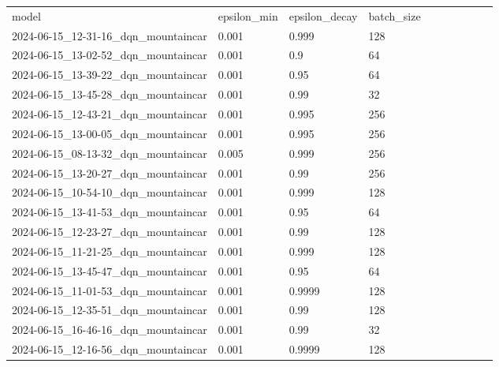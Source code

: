 \documentclass[a4paper,12pt]{article}
\begin{document}
\begin{center}
    \resizebox{\textwidth}{!} {
        \begin{tabular}{llllllllll}
            model                                  & epsilon\_min & epsilon\_decay & batch\_size \\
            2024-06-15\_12-31-16\_dqn\_mountaincar & 0.001        & 0.999          & 128         \\
            2024-06-15\_13-02-52\_dqn\_mountaincar & 0.001        & 0.9            & 64          \\
            2024-06-15\_13-39-22\_dqn\_mountaincar & 0.001        & 0.95           & 64          \\
            2024-06-15\_13-45-28\_dqn\_mountaincar & 0.001        & 0.99           & 32          \\
            2024-06-15\_12-43-21\_dqn\_mountaincar & 0.001        & 0.995          & 256         \\
            2024-06-15\_13-00-05\_dqn\_mountaincar & 0.001        & 0.995          & 256         \\
            2024-06-15\_08-13-32\_dqn\_mountaincar & 0.005        & 0.999          & 256         \\
            2024-06-15\_13-20-27\_dqn\_mountaincar & 0.001        & 0.99           & 256         \\
            2024-06-15\_10-54-10\_dqn\_mountaincar & 0.001        & 0.999          & 128         \\
            2024-06-15\_13-41-53\_dqn\_mountaincar & 0.001        & 0.95           & 64          \\
            2024-06-15\_12-23-27\_dqn\_mountaincar & 0.001        & 0.99           & 128         \\
            2024-06-15\_11-21-25\_dqn\_mountaincar & 0.001        & 0.999          & 128         \\
            2024-06-15\_13-45-47\_dqn\_mountaincar & 0.001        & 0.95           & 64          \\
            2024-06-15\_11-01-53\_dqn\_mountaincar & 0.001        & 0.9999         & 128         \\
            2024-06-15\_12-35-51\_dqn\_mountaincar & 0.001        & 0.99           & 128         \\
            2024-06-15\_16-46-16\_dqn\_mountaincar & 0.001        & 0.99           & 32          \\
            2024-06-15\_12-16-56\_dqn\_mountaincar & 0.001        & 0.9999         & 128         \\

\end{tabular}}
\end{center}
\end{document}
